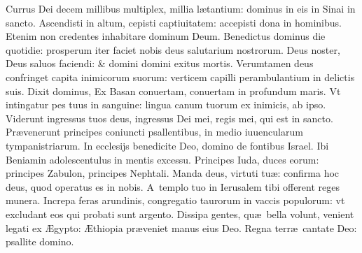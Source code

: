\documentclass[a5paper,10pt]{book}
\def\ae{æ}
\def\AE{Æ}
\begin{document}
\begin{multicols*}{2}
\newline \color{red} C\color{black}urrus Dei decem millibus multiplex, millia l\ae tantium: dominus in eis in Sinai in sancto.%
\newline \color{red} A\color{black}scendisti in altum, cepisti captiuitatem: accepisti dona in hominibus.
\newline \color{red} E\color{black}tenim non credentes inhabitare dominum Deum.
\newline \color{red} B\color{black}enedictus dominus die quotidie: prosperum iter faciet nobis deus salutarium nostrorum.
\newline \color{red} D\color{black}eus noster, Deus saluos faciendi: \& domini domini exitus mortis.
\newline \color{red} V\color{black}erumtamen deus confringet capita inimicorum suorum: verticem capilli perambulantium in delictis suis.
\newline \color{red} D\color{black}ixit dominus, Ex Basan conuertam, conuertam in profundum maris.
\newline \color{red} V\color{black}t intingatur pes tuus in sanguine: lingua canum tuorum ex inimicis, ab ipso.
\newline \color{red} V\color{black}iderunt ingressus tuos deus, ingressus Dei mei, regis mei, qui est in sancto.
\newline \color{red} P\color{black}r\ae venerunt principes coniuncti psallentibus, in medio iuuencularum tympanistriarum.
\newline \color{red} I\color{black}n ecclesijs benedicite Deo, domino de fontibus Israel.
\newline \color{red} I\color{black}bi Beniamin adolescentulus in mentis excessu.
\newline \color{red} P\color{black}rincipes Iuda, duces eorum: principes Zabulon, principes Nephtali.
\newline \color{red} M\color{black}anda deus, virtuti tu\ae : confirma hoc deus, quod operatus es in nobis.
\newline \color{red} A\color{black}\ templo tuo in Ierusalem tibi offerent reges munera.
\newline \color{red} I\color{black}ncrepa feras arundinis, congregatio taurorum in vaccis populorum: vt excludant eos qui probati sunt argento.
\newline \color{red} D\color{black}issipa gentes, qu\ae \ bella volunt, venient legati ex \AE gypto: \AE thiopia pr\ae veniet manus eius Deo.
\newline \color{red} R\color{black}egna terr\ae \ cantate Deo: psallite domino.

\end{multicols*}
\end{document}
